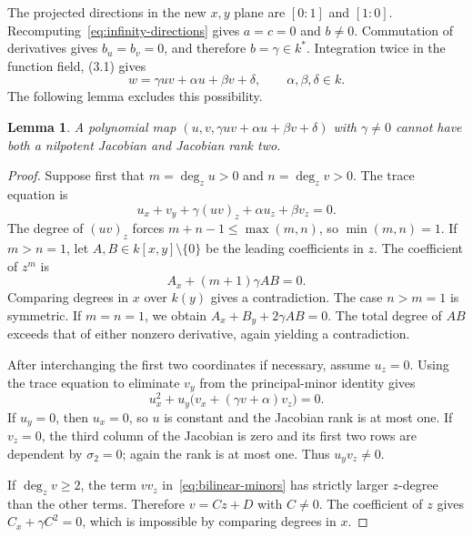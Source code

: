 \documentclass[11pt,reqno]{amsart}
\newtheorem{lemma}[theorem]{Lemma}
\theoremstyle{definition}
\theoremstyle{remark}
\numberwithin{equation}{section}
\begin{document}
The projected directions in the new $x,y$ plane are $[0:1]$ and $[1:0]$. Recomputing~\eqref{eq:infinity-directions} gives $a=c=0$ and $b\neq0$. Commutation of derivatives gives $b_u=b_v=0$, and therefore $b=\gamma\in k^*$. Integration twice in the function field, (3.1) gives
\begin{equation}\label{eq:bilinear-graph}
 w=\gamma uv+\alpha u+\beta v+\delta,\qquad \alpha,\beta,\delta\in k.
\end{equation}
The following lemma excludes this possibility.

\begin{lemma}\label{lem:bilinear-exclusion}
A polynomial map $(u,v,\gamma uv+\alpha u+\beta v+\delta)$ with $\gamma\neq0$ cannot have both a nilpotent Jacobian and Jacobian rank two.
\end{lemma}

\begin{proof}
Suppose first that $m=\deg_z u>0$ and $n=\deg_zv>0$. The trace equation is
\begin{equation}\label{eq:bilinear-trace}
 u_x+v_y+\gamma(uv)_z+\alpha u_z+\beta v_z=0.
\end{equation}
The degree of $(uv)_z$ forces $m+n-1\leq\max(m,n)$, so $\min(m,n)=1$. If $m>n=1$, let $A,B\in k[x,y]\setminus\{0\}$ be the leading coefficients in $z$. The coefficient of $z^m$ is
\[
 A_x+(m+1)\gamma AB=0.
\]
Comparing degrees in $x$ over $k(y)$ gives a contradiction. The case $n>m=1$ is symmetric. If $m=n=1$, we obtain $A_x+B_y+2\gamma AB=0$. The total degree of $AB$ exceeds that of either nonzero derivative, again yielding a contradiction.

After interchanging the first two coordinates if necessary, assume $u_z=0$. Using the trace equation to eliminate $v_y$ from the principal-minor identity gives
\begin{equation}\label{eq:bilinear-minors}
 u_x^2+u_y\bigl(v_x+(\gamma v+\alpha)v_z\bigr)=0.
\end{equation}
If $u_y=0$, then $u_x=0$, so $u$ is constant and the Jacobian rank is at most one. If $v_z=0$, the third column of the Jacobian is zero and its first two rows are dependent by $\sigma_2=0$; again the rank is at most one. Thus $u_yv_z\neq0$.

If $\deg_zv\geq2$, the term $vv_z$ in~\eqref{eq:bilinear-minors} has strictly larger $z$-degree than the other terms. Therefore $v=Cz+D$ with $C\neq0$. The coefficient of $z$ gives $C_x+\gamma C^2=0$, which is impossible by comparing degrees in $x$.
\end{proof}
\end{document}

